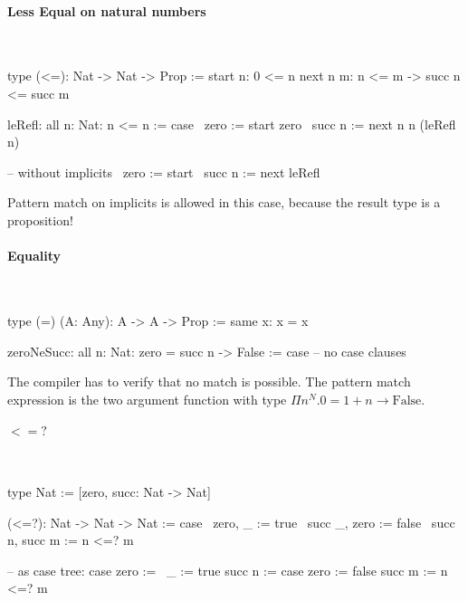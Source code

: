 \paragraph{Less Equal on natural numbers}


\ \begin{alba}
    type (<=): Nat -> Nat -> Prop :=
        start {n}:    0 <= n
        next  {n m}:  n <= m -> succ n <= succ m

    leRefl: all {n: Nat}: n <= n := case
        \ {zero}   := start {zero}
        \ {succ n} := next {n} {n} (leRefl {n})

        -- without implicits
        \ {zero}   := start
        \ {succ n} := next leRefl
\end{alba}

Pattern match on implicits is allowed in this case, because the result type is a
proposition!




\paragraph{Equality}

\ \begin{alba}
    type (=) (A: Any): A -> A -> Prop :=
        same {x}: x = x

    zeroNeSucc: all {n: Nat}: zero = succ n -> False :=
        case
            -- no case clauses
\end{alba}

The compiler has to verify that no match is possible. The pattern match
expression is the two argument function with type $\Pi n^N. 0 = 1 + n \to
\text{False}$.



\paragraph{$<=?$}
\ \begin{alba}
    type Nat := [zero, succ: Nat -> Nat]

    (<=?): Nat -> Nat -> Nat := case
        \ zero,   _      :=  true
        \ succ _, zero   :=  false
        \ succ n, succ m :=  n <=? m

    -- as case tree:
    case
        zero           :=   \ _ := true
        succ n :=
            case
                zero   :=   false
                succ m :=   n <=? m
\end{alba}


